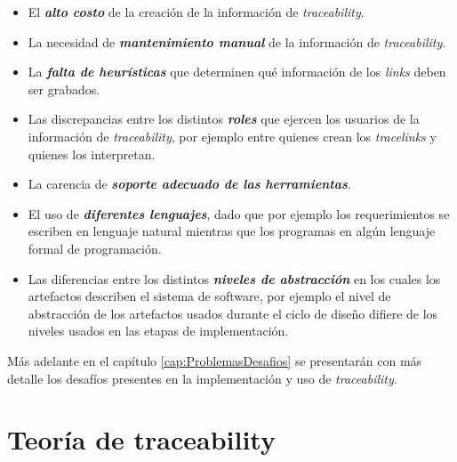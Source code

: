 \documentclass[a4paper,12pt,oneside,spanish]{book}
\begin{document}
\begin{itemize}

\item El \textit{\textbf{alto costo}} de la creación de la información de \textit{traceability}.

\item La necesidad de \textit{\textbf{mantenimiento manual}} de la información de \textit{traceability}.

\item La \textit{\textbf{falta de heurísticas}} que determinen qué información de los \textit{links} deben ser grabados.

\item Las discrepancias entre los distintos \textit{\textbf{roles}} que ejercen los usuarios de la información de \textit{traceability}, por ejemplo entre quienes crean los \textit{tracelinks} y quienes los interpretan.

\item La carencia de \textit{\textbf{soporte adecuado de las herramientas}}.

\item El uso de \textit{\textbf{diferentes lenguajes}}, dado que por ejemplo los requerimientos se escriben en lenguaje natural mientras que los programas en algún lenguaje formal de programación.

\item Las diferencias entre los distintos \textit{\textbf{niveles de abstracción}} en los cuales los artefactos describen el sistema de software, por ejemplo el nivel de abstracción de los artefactos usados durante el ciclo de diseño difiere de los niveles usados en las etapas de implementación.

\end{itemize}

Más adelante en el capítulo \ref{cap:ProblemasDesafios} se presentarán con más detalle los desafíos presentes en la implementación y uso de \textit{traceability}.



\chapter{Teoría de traceability}
\end{document}

